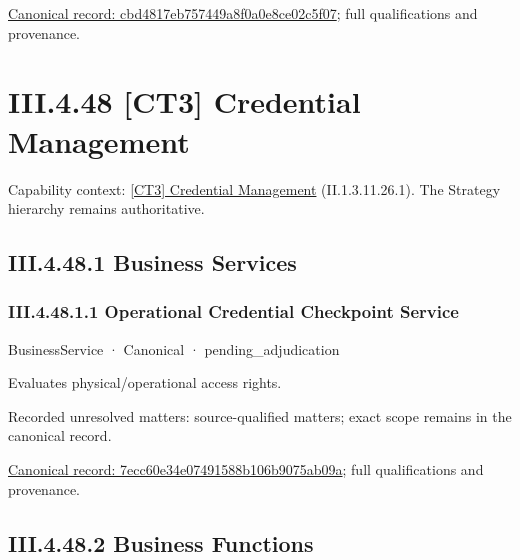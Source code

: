 {\footnotesize \href{../../../../continuum/business/business-function/cbd4817eb757449a8f0a0e8ce02c5f07.md}{Canonical record: cbd4817eb757449a8f0a0e8ce02c5f07}; full qualifications and provenance.}\par
\section*{III.4.48 [CT3] Credential Management}
\label{navigation:III.4.48}

{\small Capability context: \hyperref[element:3a7a4d2d0ce8446b8a6293284fb16b83]{[CT3] Credential Management} (II.1.3.11.26.1). The Strategy hierarchy remains authoritative.}\par
\subsection*{III.4.48.1 Business Services}
\label{navigation:III.4.48.1}

\subsubsection*{III.4.48.1.1 Operational Credential Checkpoint Service}
\label{navigation:III.4.48.1.1}

\label{element:7ecc60e34e07491588b106b9075ab09a}
{\small BusinessService · Canonical · pending\_adjudication}\par

Evaluates physical/operational access rights.


{\small Recorded unresolved matters: source-qualified matters; exact scope remains in the canonical record.}\par
{\footnotesize \href{../../../../continuum/business/business-service/7ecc60e34e07491588b106b9075ab09a.md}{Canonical record: 7ecc60e34e07491588b106b9075ab09a}; full qualifications and provenance.}\par
\subsection*{III.4.48.2 Business Functions}
\label{navigation:III.4.48.2}

